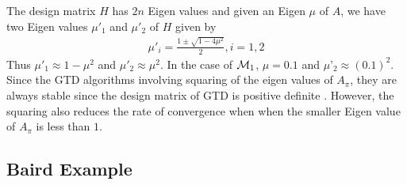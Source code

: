 The design matrix $H$ has $2n$ Eigen values and given an Eigen $\mu$ of $A$, we have two Eigen values $\mu'_1$ and $\mu'_2$ of $H$ given by
\begin{align}
\mu'_{i}=\frac{1\pm \sqrt{1-4\mu^2}}{2}, i=1,2
\end{align}
Thus $\mu'_1\approx 1-\mu^2$ and $\mu'_2\approx \mu^2$. In the case of $\mathcal{M}_1$, $\mu=0.1$ and $\mu’_2\approx (0.1)^2$. Since the GTD algorithms involving squaring of the eigen values of $A_\pi$, they are always stable since the design matrix of GTD is positive definite \cite{gtdref}. However, the squaring also reduces the rate of convergence when when the smaller Eigen value of $A_\pi$ is less than $1$.
\subsection{Baird Example}

